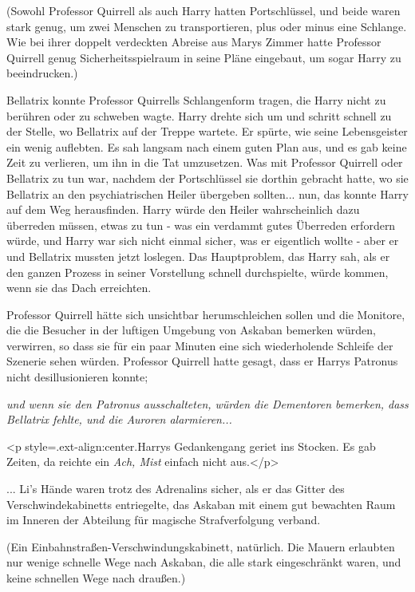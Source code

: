 (Sowohl Professor Quirrell als auch Harry hatten Portschlüssel, und beide waren
stark genug, um zwei Menschen zu transportieren, plus oder minus eine Schlange.
Wie bei ihrer doppelt verdeckten Abreise aus Marys Zimmer hatte Professor
Quirrell genug Sicherheitsspielraum in seine Pläne eingebaut, um sogar Harry zu
beeindrucken.)

Bellatrix konnte Professor Quirrells Schlangenform tragen, die Harry nicht zu
berühren oder zu schweben wagte. Harry drehte sich um und schritt schnell zu der
Stelle, wo Bellatrix auf der Treppe wartete. Er spürte, wie seine Lebensgeister
ein wenig auflebten. Es sah langsam nach einem guten Plan aus, und es gab keine
Zeit zu verlieren, um ihn in die Tat umzusetzen. Was mit Professor Quirrell oder
Bellatrix zu tun war, nachdem der Portschlüssel sie dorthin gebracht hatte, wo
sie Bellatrix an den psychiatrischen Heiler übergeben sollten... nun, das konnte
Harry auf dem Weg herausfinden. Harry würde den Heiler wahrscheinlich dazu
überreden müssen, etwas zu tun - was ein verdammt gutes Überreden erfordern
würde, und Harry war sich nicht einmal sicher, was er eigentlich wollte - aber
er und Bellatrix mussten jetzt loslegen. Das Hauptproblem, das Harry sah, als er
den ganzen Prozess in seiner Vorstellung schnell durchspielte, würde kommen,
wenn sie das Dach erreichten.

Professor Quirrell hätte sich unsichtbar herumschleichen sollen und die
Monitore, die die Besucher in der luftigen Umgebung von Askaban bemerken würden,
verwirren, so dass sie für ein paar Minuten eine sich wiederholende Schleife der
Szenerie sehen würden. Professor Quirrell hatte gesagt, dass er Harrys Patronus
nicht desillusionieren konnte;

\emph{und wenn sie den Patronus ausschalteten, würden die Dementoren bemerken, dass Bellatrix fehlte, und die Auroren alarmieren...}

<p style=\grqq{}.ext-align:center\grqq{}.Harrys Gedankengang geriet ins Stocken.
Es gab Zeiten, da reichte ein \emph{ \glqq Ach, Mist\grqq{} } einfach nicht
aus.</p>

... Li's Hände waren trotz des Adrenalins sicher, als er das Gitter des
Verschwindekabinetts entriegelte, das Askaban mit einem gut bewachten Raum im
Inneren der Abteilung für magische Strafverfolgung verband.

(Ein Einbahnstraßen-Verschwindungskabinett, natürlich. Die Mauern erlaubten nur
wenige schnelle Wege nach Askaban, die alle stark eingeschränkt waren, und keine
schnellen Wege nach draußen.)


